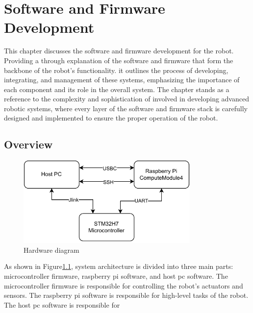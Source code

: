 \chapter{Software and Firmware Development}

\graphicspath{{./Figures/Firmware and Testing/}}
This chapter discusses the software and firmware development for the robot.
Providing a through explanation of the software and firmware that form the backbone of the robot's functionality.
it outlines the process of developing, integrating, and management of these systems, emphasizing the importance of each component and its role in the overall system.
The chapter stands as a reference to the complexity and sophistication of involved in developing advanced robotic systems, where every layer of the software and firmware stack is carefully designed and implemented to ensure the proper operation of the robot.

\newpage
\section{Overview}
\begin {figure}[h]
\centering
\includegraphics[width=0.8\textwidth]{Hardware diagram}
\caption{Hardware diagram}
\label{fig:Hardware}
\end {figure}

As shown in Figure\ref{fig:Hardware}, system architecture is divided into three main parts: microcontroller firmware, raspberry pi software, and host pc software.
The microcontroller firmware is responsible for controlling the robot's actuators and sensors.
The raspberry pi software is responsible for high-level tasks of the robot.
The host pc software is responsible for

